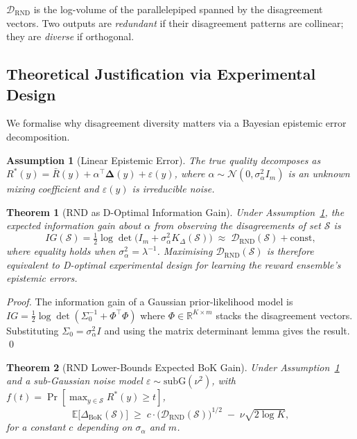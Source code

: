 \documentclass{article}
\newtheorem{theorem}{Theorem}
\newtheorem{assumption}{Assumption}
\newcommand{\E}{\mathbb{E}}
\newcommand{\R}{\mathbb{R}}
\newcommand{\cS}{\mathcal{S}}
\newcommand{\Rbar}{\bar{R}}
\newcommand{\Rstar}{R^{*}}
\newcommand{\DRND}{\mathcal{D}_{\mathrm{RND}}}
\newcommand{\DeltaBoK}{\Delta_{\mathrm{BoK}}}
\newcommand{\Deltavec}{\boldsymbol{\Delta}}
\begin{document}
$\DRND$ is the log-volume of the parallelepiped spanned by the disagreement
vectors.  Two outputs are \emph{redundant} if their disagreement patterns are
collinear; they are \emph{diverse} if orthogonal.

\subsection{Theoretical Justification via Experimental Design}
\label{sec:theory_rnd}

We formalise why disagreement diversity matters via a Bayesian epistemic error
decomposition.

\begin{assumption}[Linear Epistemic Error]
\label{asm:linear}
The true quality decomposes as
$\Rstar(y) = \Rbar(y) + \alpha^\top \Deltavec(y) + \varepsilon(y)$,
where $\alpha \sim \mathcal{N}(0, \sigma_\alpha^2 I_m)$ is an unknown
mixing coefficient and $\varepsilon(y)$ is irreducible noise.
\end{assumption}

\begin{theorem}[RND as D-Optimal Information Gain]
\label{thm:boed}
Under Assumption~\ref{asm:linear}, the expected information gain about
$\alpha$ from observing the disagreements of set $\cS$ is
\[
  IG(\cS) = \tfrac{1}{2}\log\det\!\bigl(I_m + \sigma_\alpha^2 K_\Delta(\cS)\bigr)
  \;\approx\; \DRND(\cS) + \mathrm{const},
\]
where equality holds when $\sigma_\alpha^2 = \lambda^{-1}$.
Maximising $\DRND(\cS)$ is therefore equivalent to D-optimal experimental
design for learning the reward ensemble's epistemic errors.
\end{theorem}

\begin{proof}
The information gain of a Gaussian prior-likelihood model is
$IG = \frac{1}{2}\log\det(\Sigma_0^{-1} + \Phi^\top \Phi)$ where
$\Phi \in \R^{K\times m}$ stacks the disagreement vectors.
Substituting $\Sigma_0 = \sigma_\alpha^2 I$ and using the
matrix determinant lemma gives the result. \qed
\end{proof}

\begin{theorem}[RND Lower-Bounds Expected BoK Gain]
\label{thm:bok_lb}
Under Assumption~\ref{asm:linear} and a sub-Gaussian noise model
$\varepsilon \sim \mathrm{subG}(\nu^2)$, with $f(t) = \Pr[\max_{y\in\cS}\Rstar(y) \ge t]$,
\[
  \E\bigl[\DeltaBoK(\cS)\bigr]
  \;\ge\;
  c \cdot \bigl(\DRND(\cS)\bigr)^{1/2} \;-\; \nu\sqrt{2\log K},
\]
for a constant $c$ depending on $\sigma_\alpha$ and $m$.
\end{theorem}
\end{document}
